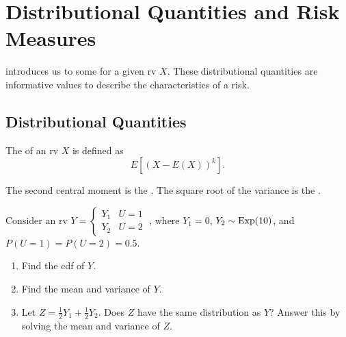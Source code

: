 \documentclass[notoc,notitlepage]{tufte-book}
\begin{document}


\section{Distributional Quantities and Risk Measures}%
\label{sec:distributional_quantities_and_risk_measures}

 introduces us to some  for a given rv $X$. These distributional quantities are informative values to describe the characteristics of a risk.

\subsection{Distributional Quantities}%
\label{sub:distributional_quantities}

\begin{defn}
\label{defn:central_moment}
  The  of an rv $X$ is defined as
  \begin{equation*}
    E\left[ (X - E(X))^k \right].
  \end{equation*}
\end{defn}

\begin{note}
  The second central moment is the . The square root of the variance is the .
\end{note}

\begin{eg}
  Consider an rv $Y = \begin{cases} Y_1 & U = 1 \\ Y_2 & U = 2 \end{cases} \; $, where $Y_1 = 0$, $Y_2 \sim \operatorname{Exp}(10)$, and $P(U = 1) = P(U = 2) = 0.5$.
  \begin{enumerate}
    \item Find the cdf of $Y$.
    \item Find the mean and variance of $Y$.
    \item Let $Z = \frac{1}{2} Y_1 + \frac{1}{2} Y_2$. Does $Z$ have the same distribution as $Y$? Answer this by solving the mean and variance of $Z$.
  \end{enumerate}
\end{eg}
\end{document}
